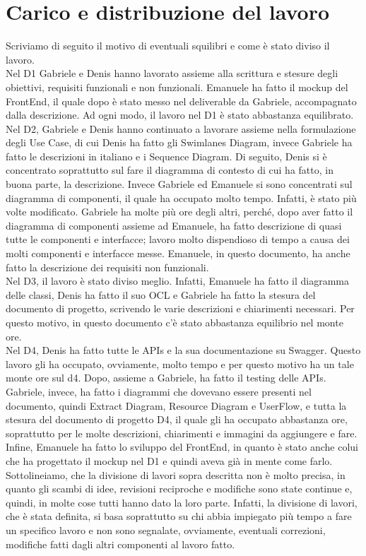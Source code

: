 \documentclass{article}
\begin{document}
\section{Carico e distribuzione del lavoro}

Scriviamo di seguito il motivo di eventuali squilibri e come è stato diviso il lavoro.\\
Nel D1 Gabriele e Denis hanno lavorato assieme alla scrittura e stesure degli obiettivi, requisiti funzionali e non funzionali. Emanuele ha fatto il mockup del FrontEnd, il quale dopo è stato messo nel deliverable da Gabriele, accompagnato dalla descrizione. Ad ogni modo, il lavoro nel D1 è stato abbastanza equilibrato. \\
Nel D2, Gabriele e Denis hanno continuato a lavorare assieme nella formulazione degli Use Case, di cui Denis ha fatto gli Swimlanes Diagram, invece Gabriele ha fatto le descrizioni in italiano e i Sequence Diagram. Di seguito, Denis si è concentrato soprattutto sul fare il diagramma di contesto di cui ha fatto, in buona parte, la descrizione. Invece Gabriele ed Emanuele si sono concentrati sul diagramma di componenti, il quale ha occupato molto tempo. Infatti, è stato più volte modificato. Gabriele ha molte più ore degli altri, perché, dopo aver fatto il diagramma di componenti assieme ad Emanuele, ha fatto descrizione di quasi tutte le componenti e interfacce; lavoro molto dispendioso di tempo a causa dei molti componenti e interfacce messe. Emanuele, in questo documento, ha anche fatto la descrizione dei requisiti non funzionali.\\
Nel D3, il lavoro è stato diviso meglio. Infatti, Emanuele ha fatto il diagramma delle classi, Denis ha fatto il suo OCL e Gabriele ha fatto la stesura del documento di progetto, scrivendo le varie descrizioni e chiarimenti necessari. Per questo motivo, in questo documento c'è stato abbastanza equilibrio nel monte ore.\\
Nel D4, Denis ha fatto tutte le APIs e la sua documentazione su Swagger. Questo lavoro gli ha occupato, ovviamente, molto tempo e per questo motivo ha un tale monte ore sul d4. Dopo, assieme a Gabriele, ha fatto il testing delle APIs. Gabriele, invece, ha fatto i diagrammi che dovevano essere presenti nel documento, quindi Extract Diagram, Resource Diagram e UserFlow, e tutta la stesura del documento di progetto D4, il quale gli ha occupato abbastanza ore, soprattutto per le molte descrizioni, chiarimenti e immagini da aggiungere e fare. Infine, Emanuele ha fatto lo sviluppo del FrontEnd, in quanto è stato anche colui che ha progettato il mockup nel D1 e quindi aveva già in mente come farlo.\\
Sottolineiamo, che la divisione di lavori sopra descritta non è molto precisa, in quanto gli scambi di idee, revisioni reciproche e modifiche sono state continue e, quindi, in molte cose tutti hanno dato la loro parte. Infatti, la divisione di lavori, che è stata definita, si basa soprattutto su chi abbia impiegato più tempo a fare un specifico lavoro e non sono segnalate, ovviamente, eventuali correzioni, modifiche fatti dagli altri componenti al lavoro fatto.
\end{document}
